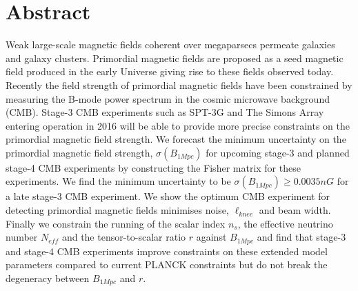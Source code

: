 \section*{Abstract}

Weak large-scale magnetic fields coherent over megaparsecs permeate galaxies and galaxy clusters. Primordial magnetic fields are proposed as a seed magnetic field produced in the early Universe giving rise to these fields observed today. Recently the field strength of primordial magnetic fields have been constrained by measuring the B-mode power spectrum in the cosmic microwave background (CMB). Stage-3 CMB experiments such as SPT-3G and The Simons Array entering operation in 2016 will be able to provide more precise constraints on the primordial magnetic field strength. We forecast the minimum uncertainty on the primordial magnetic field strength, $\sigma(B_{1Mpc})$ for upcoming stage-3 and planned stage-4 CMB experiments by constructing the Fisher matrix for these experiments. We find the minimum uncertainty to be $\sigma(B_{1Mpc}) \geq 0.0035nG$ for a late stage-3 CMB experiment. We show the optimum CMB experiment for detecting primordial magnetic fields minimises noise, $\ell_{knee}$ and beam width.
Finally we constrain the running of the scalar index $n_{s}$, the effective neutrino number $N_{eff}$ and the tensor-to-scalar ratio $r$ against $B_{1Mpc}$ and find that stage-3 and stage-4 CMB experiments improve constraints on these extended model parameters compared to current PLANCK constraints but do not break the degeneracy between $B_{1Mpc}$ and $r$.